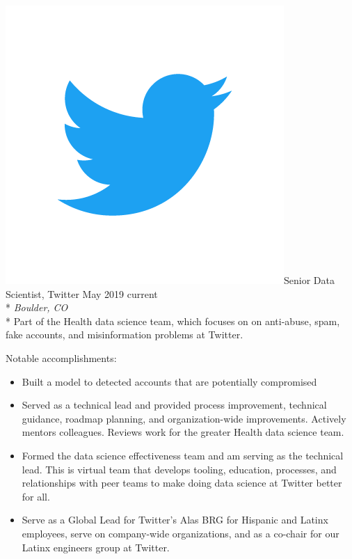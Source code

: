 \documentclass[print]{friggeri-cv} %
\newcommand{\twittericon}{\includegraphics[scale=0.05]{Twitter_Logo_Blue.png}}%
\begin{document}
\begin{description} \itemsep1pt \parskip0pt 
  \item \twittericon {\largeheaderfont Senior Data Scientist, Twitter } \hfill
    {\smallheaderfont May 2019 \textemdash  current}\\*
    {\footnotesize \emph{Boulder, CO}} \\*
    Part of the Health data science team, which focuses on on anti-abuse,
    spam, fake accounts, and misinformation problems at Twitter.

    {\smallheaderfont Notable accomplishments}:
    \begin{itemize} \itemsep1pt \parskip1pt 

    \item Built a model to detected accounts that are potentially compromised
    \item Served as a technical lead and provided process improvement,
      technical guidance, roadmap planning, and organization-wide improvements.
      Actively mentors colleagues. Reviews work for the greater Health data science
      team.
    \item Formed the data science effectiveness team and am serving as the
      technical lead. This is virtual team that develops tooling, education,
      processes, and relationships with peer teams to make doing data science
      at Twitter better for all.
    \item Serve as a Global Lead for Twitter's Alas BRG for Hispanic and Latinx
      employees, serve on company-wide organizations, and as a co-chair for our
      Latinx engineers group at Twitter.

  \end{itemize}

  \end{description}
\end{document}
